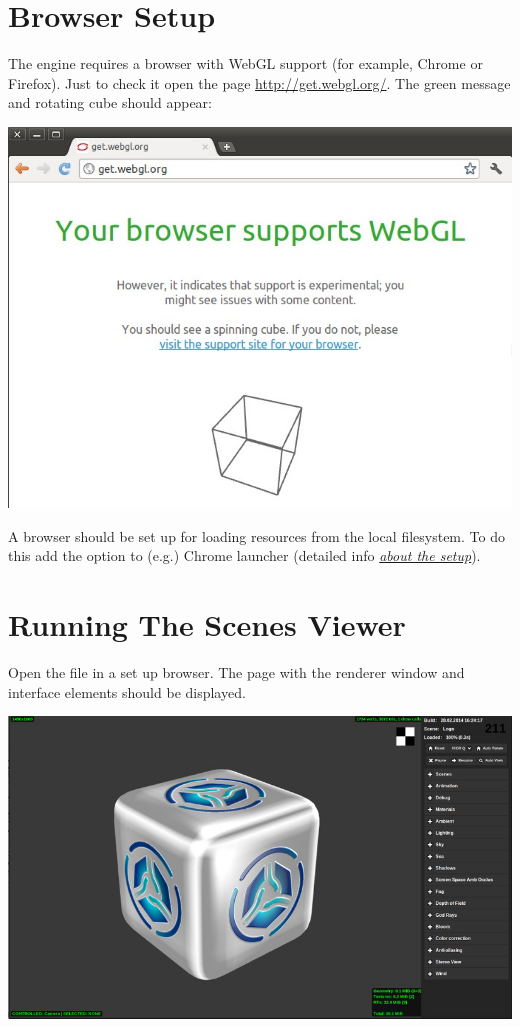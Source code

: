 \documentclass[a4paper,12pt,oneside]{sphinxmanual}
\begin{document}
\section{Browser Setup}
\label{setup:index-0}\label{setup:getting-started-browser}\label{setup:id3}
The engine requires a browser with WebGL support (for example, Chrome or Firefox). Just to check it open the page \href{http://get.webgl.org/}{http://get.webgl.org/}. The green message and rotating cube should appear:

{\hfill\includegraphics[width=1.000\linewidth]{browser_supports_webgl.jpg}\hfill}

A browser should be set up for loading resources from the local filesystem. To do this add the  option to (e.g.) Chrome launcher (detailed info {\hyperref[problems_and_solutions:browser-for-local-loading]{\emph{about the setup}}}).


\section{Running The Scenes Viewer}
\label{setup:id4}\label{setup:getting-started-launching-viewer}\label{setup:index-2}
Open the  file in a set up browser. The page with the renderer window and interface elements should be displayed.

{\hfill\includegraphics[width=1.000\linewidth]{default_page.jpg}\hfill}
\end{document}
